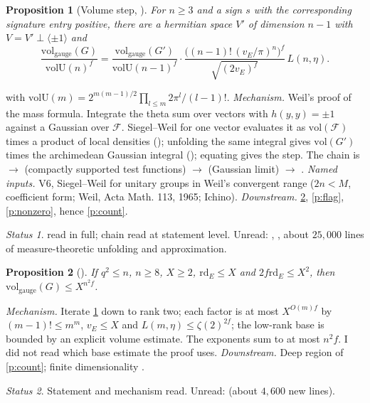 \documentclass[11pt]{article}
\newcommand{\rd}{\mathrm{rd}}
\newcommand{\vol}{\mathrm{vol}}
\newtheorem{prop}{Proposition}
\theoremstyle{remark}
\newtheorem*{status}{Status}
\begin{document}
\begin{prop}[Volume step, ]\label{p:vstep}
For $n\ge3$ and a sign $s$ with the corresponding signature entry positive, there are a hermitian space $V'$ of dimension $n-1$ with $V=V'\perp\langle\pm1\rangle$ and
\[
\frac{\vol_{\mathrm{gauge}}(G)}{\mathrm{volU}(n)^{f}}=\frac{\vol_{\mathrm{gauge}}(G')}{\mathrm{volU}(n-1)^{f}}\cdot\frac{\bigl((n-1)!\,(v_E/\pi)^n\bigr)^f}{\sqrt{(2v_E)^f}}\,L(n,\eta).
\]
\end{prop}
with $\mathrm{volU}(m)=2^{m(m-1)/2}\prod_{l\le m}2\pi^l/(l-1)!$. \emph{Mechanism.} Weil's proof of the mass formula. Integrate the theta sum over vectors with $h(y,y)=\pm1$ against a Gaussian over $\mathcal F$. Siegel--Weil for one vector evaluates it as $\vol(\mathcal F)$ times a product of local densities (); unfolding the same integral gives $\vol(G')$ times the archimedean Gaussian integral (); equating gives the step. The chain is  $\to$  (compactly supported test functions) $\to$  (Gaussian limit) $\to$ .
\emph{Named inputs.} V6, Siegel--Weil for unitary groups in Weil's convergent range ($2n< M$, coefficient form; Weil, Acta Math. 113, 1965; Ichino).
\emph{Downstream.} \ref{p:absvol}, \ref{p:flag}, \ref{p:nonzero}, hence \ref{p:count}.
\begin{status} read in full; chain read at statement level. Unread: , , about $25{,}000$ lines of measure-theoretic unfolding and approximation.\end{status}

\begin{prop}[]\label{p:absvol}
If $q^2\le n$, $n\ge8$, $X\ge2$, $\rd_E\le X$ and $2f\rd_E\le X^2$, then $\vol_{\mathrm{gauge}}(G)\le X^{n^2f}$.
\end{prop}
\emph{Mechanism.} Iterate \ref{p:vstep} down to rank two; each factor is at most $X^{O(m)f}$ by $(m-1)!\le m^m$, $v_E\le X$ and $L(m,\eta)\le\zeta(2)^{2f}$; the low-rank base is bounded by an explicit volume estimate. The exponents sum to at most $n^2f$. I did not read which base estimate the proof uses.
\emph{Downstream.} Deep region of \ref{p:count}; finite dimensionality .
\begin{status}Statement and mechanism read. Unread:  (about $4{,}600$ new lines).\end{status}
\end{document}
